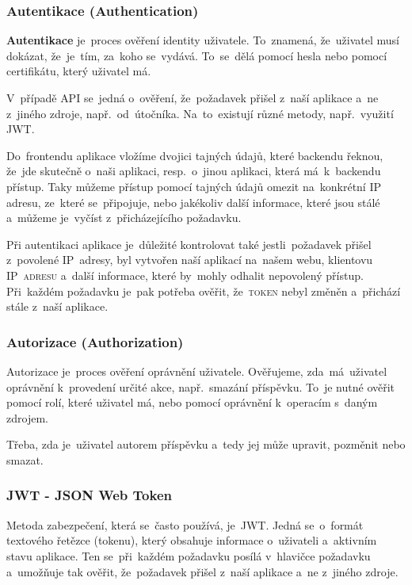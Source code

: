 \documentclass[14pt,a4paper]{article}
\begin{document}
            \subsubsection{Autentikace (Authentication)}
            \textbf{Autentikace} je~proces ověření identity uživatele. To~znamená, že~uživatel musí dokázat, že~je~tím, za~koho se~vydává. To~se~dělá pomocí hesla nebo pomocí certifikátu, který uživatel má.
            
            V~případě \textsc{API} se~jedná o~ověření, že~požadavek přišel z~naší aplikace a~ne z~jiného zdroje, např.~od~útočníka. Na~to~existují různé metody, např.~využití \textsc{JWT}.
            
            Do~frontendu aplikace vložíme dvojici tajných údajů, které backendu řeknou, že~jde skutečně o~naši aplikaci, resp.~o~jinou aplikaci, která má~k~backendu přístup. Taky můžeme přístup pomocí tajných údajů omezit na~konkrétní IP adresu, ze~které se~připojuje, nebo jakékoliv další informace, které jsou stálé a~můžeme je~vyčíst z~přicházejícího požadavku.

            Při autentikaci aplikace je~důležité kontrolovat také jestli~požadavek přišel z~povolené IP~adresy, byl vytvořen naší aplikací na~našem webu, klientovu \textsc{IP~adresu} a~další informace, které by~mohly odhalit nepovolený přístup. Při~každém požadavku je~pak potřeba ověřit, že~\textsc{token} nebyl změněn a~přichází stále z~naší aplikace. \parencite{graham2021ethical}
            
            \subsubsection{Autorizace (Authorization)}
            Autorizace je~proces ověření oprávnění uživatele. Ověřujeme, zda~má~uživatel oprávnění k~provedení určité akce, např.~smazání příspěvku.
            To~je nutné ověřit pomocí rolí, které uživatel má, nebo pomocí oprávnění k~operacím s~daným zdrojem.

            Třeba, zda je~uživatel autorem příspěvku a~tedy jej může upravit, pozměnit nebo smazat. \parencite{graham2021ethical}

            \subsubsection{JWT - JSON Web Token}
            Metoda zabezpečení, která se~často používá, je~JWT. Jedná se~o~formát textového řetězce (tokenu), který obsahuje informace o~uživateli a~aktivním stavu aplikace. Ten se~při~každém požadavku posílá v~hlavičce požadavku a~umožňuje tak ověřit, že~požadavek přišel z~naší aplikace a~ne z~jiného zdroje.
            
\end{document}

